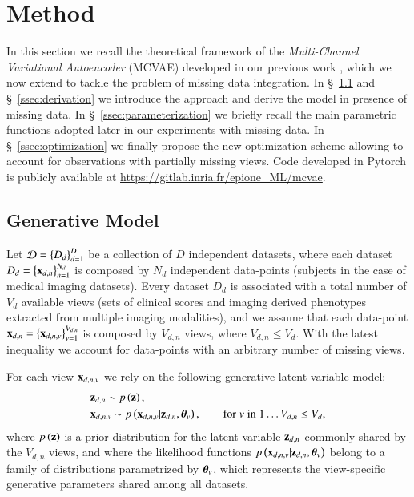 \section{Method}
\label{sec:method}

In this section we recall the theoretical framework of the \textit{Multi-Channel Variational Autoencoder} (MCVAE) developed in our previous work \citep{Antelmi2019}, which we now extend to tackle the problem of missing data integration.
In \S~\ref{ssec:generative_model} and \S~\ref{ssec:derivation} we introduce the approach and derive the model in presence of missing data.
In \S~\ref{ssec:parameterization} we briefly recall the main parametric functions adopted later in our experiments with missing data.
In \S~\ref{ssec:optimization} we finally propose the new optimization scheme allowing to account for observations with partially missing views.
Code developed in Pytorch \citep{Paszke2019} is publicly available at \url{https://gitlab.inria.fr/epione\_ML/mcvae}.

\subsection{Generative Model}
\label{ssec:generative_model}

Let $\mathcal{D} = \left\{D_d\right\}_{d=1}^D$ be a collection of $D$ independent datasets, where each dataset $D_d = \left\{\mathbf{x}_{d,n}\right\}_{n=1}^{N_d}$ is composed by $N_d$ independent data-points (\eg subjects in the case of medical imaging datasets).
Every dataset $D_d$ is associated with a total number of $V_d$ available views
(\eg sets of clinical scores and imaging derived phenotypes extracted from multiple imaging modalities),
and we assume that each data-point $\mathbf{x}_{d,n} = \left\{\mathbf{x}_{d,n,v}\right\}_{v=1}^{V_{d,n}}$ is composed by $V_{d,n}$ views,
where $V_{d,n} \leq V_d$.
With the latest inequality we account for data-points with an arbitrary number of missing views.

For each view $\mathbf{x}_{d,n,v}$ we rely on the following generative latent variable model:
\begin{equation}\label{eq:model}
\begin{aligned}
&\z_{d,n} \sim \p{\z}, \\  %
&\xdnv \sim \p{\xdnv|\z_{d,n},\thetab_v},  %
\qquad \textnormal {for} \; v \; \textnormal{in} \; 1 \ldots V_{d,n} \leq V_d,
\end{aligned}
\end{equation}
where $p\left(\mathbf{z}\right)$ is a prior distribution for the latent variable $\mathbf{z}_{d,n}$ commonly shared by the $V_{d,n}$ views, and
where the likelihood functions $p\left(\mathbf{x}_{d,n,v}|\mathbf{z}_{d,n},\boldsymbol{\theta}_v\right)$ belong to a family of distributions parametrized by $\boldsymbol{\theta}_v$, which represents the view-specific generative parameters shared among all datasets.

